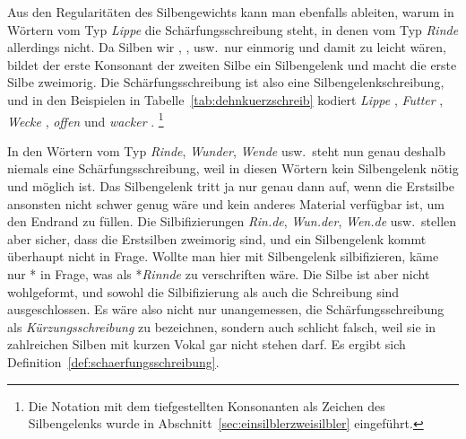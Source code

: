Aus den Regularitäten des Silbengewichts kann man ebenfalls ableiten, warum in Wörtern vom Typ \textit{Lippe} die Schärfungsschreibung steht, in denen vom Typ \textit{Rinde} allerdings nicht.
Da Silben wir \textipa{[lI]}, \textipa{[fU]}, \textipa{[vW]} usw.\ nur einmorig und damit zu leicht wären, bildet der erste Konsonant der zweiten Silbe ein Silbengelenk und macht die erste Silbe zweimorig.
Die Schärfungsschreibung ist also eine Silbengelenkschreibung, und in den Beispielen in Tabelle~\ref{tab:dehnkuerzschreib} kodiert \textit{Lippe} \textipa{[lI\Sgel{p}@]}, \textit{Futter} \textipa{[fU\Sgel{t}5]}, \textit{Wecke} \textipa{[vE\Sgel{k}@]}, \textit{offen} \textipa{[O\Sgel{f}@n]} und \textit{wacker} \textipa{[va\Sgel{k}5]}.%
\footnote{Die Notation mit dem tiefgestellten Konsonanten als Zeichen des Silbengelenks wurde in Abschnitt~\ref{sec:einsilblerzweisilbler} eingeführt.}

In den Wörtern vom Typ \textit{Rinde}, \textit{Wunder}, \textit{Wende} usw.\ steht nun genau deshalb niemals eine Schärfungsschreibung, weil in diesen Wörtern kein Silbengelenk nötig und möglich ist.
Das Silbengelenk tritt ja nur genau dann auf, wenn die Erstsilbe ansonsten nicht schwer genug wäre und kein anderes Material verfügbar ist, um den Endrand zu füllen.
Die Silbifizierungen \textit{Rin.de}, \textit{Wun.der}, \textit{Wen.de} usw.\ stellen aber sicher, dass die Erstsilben zweimorig sind, und ein Silbengelenk kommt überhaupt nicht in Frage.
Wollte man hier mit Silbengelenk silbifizieren, käme nur *\textipa{[KI\Sgel{n}d@]} in Frage, was als *\textit{Rinnde} zu verschriften wäre.
Die Silbe \textipa{[nd@]} ist aber nicht wohlgeformt, und sowohl die Silbifizierung als auch die Schreibung sind ausgeschlossen.
Es wäre also nicht nur unangemessen, die Schärfungsschreibung als \textit{Kürzungsschreibung} zu bezeichnen, sondern auch schlicht falsch, weil sie in zahlreichen Silben mit kurzen Vokal gar nicht stehen darf.
Es ergibt sich Definition~\ref{def:schaerfungsschreibung}.


